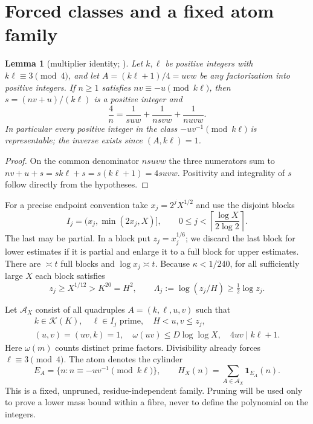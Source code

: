 \documentclass[10pt,reqno]{amsart}
\newtheorem{lemma}[theorem]{Lemma}
\theoremstyle{remark}
\newcommand{\K}{\mathcal K}
\newcommand{\A}{\mathcal A}
\newcommand{\ind}{\mathbf1}
\begin{document}
\section{Forced classes and a fixed atom family}\label{sec:atoms}
\begin{lemma}[multiplier identity; {\cite[Lemma 2.1]{LL}}]\label{lem:identity}
Let $k,\ell$ be positive integers with $k\ell\equiv3\pmod4$, and let
$A=(k\ell+1)/4=uvw$ be any factorization into positive integers.  If $n\geq1$
satisfies $nv\equiv-u\pmod{k\ell}$, then $s=(nv+u)/(k\ell)$ is a positive
integer and
\[
 \frac4n=\frac1{suw}+\frac1{nsvw}+\frac1{nuvw}.
\]
In particular every positive integer in the class $-uv^{-1}\pmod{k\ell}$ is
representable; the inverse exists since $(A,k\ell)=1$.
\end{lemma}
\begin{proof}
On the common denominator $nsuvw$ the three numerators sum to
$nv+u+s=sk\ell+s=s(k\ell+1)=4suvw$.  Positivity and integrality of $s$
follow directly from the hypotheses.
\end{proof}

For a precise endpoint convention take $x_j=2^jX^{1/2}$ and use the disjoint
blocks
\[
 I_j=(x_j,\min(2x_j,X)],\qquad
 0\leq j<\left\lceil\frac{\log X}{2\log2}\right\rceil.
\]
The last may be partial.  In a block put $z_j=x_j^{1/6}$; we discard the
last block for lower estimates if it is partial and enlarge it to a full
block for upper estimates.  There are $\asymp t$ full blocks and
$\log x_j\asymp t$.  Because $\kappa<1/240$, for all sufficiently large
$X$ each block satisfies
\begin{equation}\label{eq:floor}
 z_j\geq X^{1/12}>K^{20}=H^2,
 \qquad \Lambda_j:=\log(z_j/H)\geq\tfrac12\log z_j.
\end{equation}

Let $\A_X$ consist of all quadruples $A=(k,\ell,u,v)$ such that
\begin{equation}\label{eq:atomdef}
 \begin{gathered}
 k\in\K(K),\quad \ell\in I_j\text{ prime},\quad H<u,v\leq z_j,\\
 (u,v)=(uv,k)=1,\quad \omega(uv)\leq D\log\log X,
 \quad 4uv\mid k\ell+1.
 \end{gathered}
\end{equation}
Here $\omega(m)$ counts distinct prime factors.  Divisibility already forces
$\ell\equiv3\pmod4$.  The atom denotes the cylinder
\begin{equation}\label{eq:cylinder}
 E_A=\{n:n\equiv-uv^{-1}\pmod{k\ell}\},\qquad
 H_X(n)=\sum_{A\in\A_X}\ind_{E_A}(n).
\end{equation}
This is a fixed, unpruned, residue-independent family.  Pruning will be used
only to prove a lower mass bound within a fibre, never to define the
polynomial on the integers.
\end{document}
